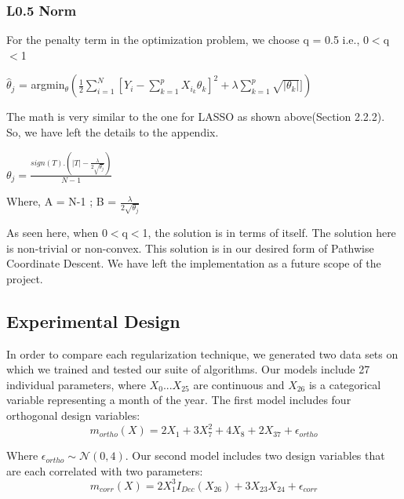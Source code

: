 \documentclass[11pt]{article}
\begin{document}
\subsubsection{L0.5 Norm}

For the penalty term in the optimization problem, we choose q = 0.5 i.e., 0$<$q$<$1
\newline

$\hat{\theta}_j$ = argmin$_{\theta} {( \frac{1}{2}  \sum_{i=1}^{N}[Y_i - \sum_{k=1}^{p} X_{i_k}\theta_k]^2  + \lambda \sum_{k=1}^p \sqrt{|\theta_k|}])}$
\newline


The math is very similar to the one for LASSO as shown above(Section 2.2.2). So, we have left the details to the appendix. 
\newline


    $\theta_j = \frac{sign(T).(|T| - \frac{\lambda}{2\sqrt{\theta_j}})}{N-1}$
\newline

Where, 
A = N-1 ; B = $\frac{\lambda}{2\sqrt{\theta_j}}$
\newline

As seen here, when 0$<$q$<$1, the solution is in terms of itself. The solution here is non-trivial or non-convex. This solution is in our desired form of Pathwise Coordinate Descent. We have left the implementation as a future scope of the project.

\subsection{Experimental Design}
In order to compare each regularization technique, we generated two data sets on which we trained and tested our suite of algorithms.  Our models include 27 individual parameters, where $X_0 ... X_{25}$ are continuous and $X_{26}$ is a categorical variable representing a month of the year.  The first model includes four orthogonal design variables:
	$$m_{ortho}(X) = 2X_1 + 3X_7^2 + 4X_8 + 2X_{37} + \epsilon_{ortho}$$

Where $\epsilon_{ortho} \sim \mathcal{N}(0,4)$.  Our second model includes two design variables that are each correlated with two parameters:
	$$m_{corr}(X) = 2X_1^3I_{Dec}(X_{26}) + 3X_{23}X_{24} + \epsilon_{corr}$$
\end{document}

